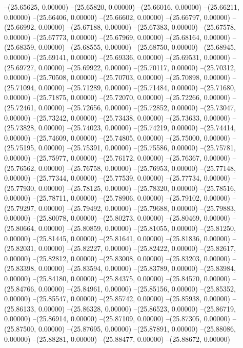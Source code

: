 --(25.65625, 0.00000)
--(25.65820, 0.00000)
--(25.66016, 0.00000)
--(25.66211, 0.00000)
--(25.66406, 0.00000)
--(25.66602, 0.00000)
--(25.66797, 0.00000)
--(25.66992, 0.00000)
--(25.67188, 0.00000)
--(25.67383, 0.00000)
--(25.67578, 0.00000)
--(25.67773, 0.00000)
--(25.67969, 0.00000)
--(25.68164, 0.00000)
--(25.68359, 0.00000)
--(25.68555, 0.00000)
--(25.68750, 0.00000)
--(25.68945, 0.00000)
--(25.69141, 0.00000)
--(25.69336, 0.00000)
--(25.69531, 0.00000)
--(25.69727, 0.00000)
--(25.69922, 0.00000)
--(25.70117, 0.00000)
--(25.70312, 0.00000)
--(25.70508, 0.00000)
--(25.70703, 0.00000)
--(25.70898, 0.00000)
--(25.71094, 0.00000)
--(25.71289, 0.00000)
--(25.71484, 0.00000)
--(25.71680, 0.00000)
--(25.71875, 0.00000)
--(25.72070, 0.00000)
--(25.72266, 0.00000)
--(25.72461, 0.00000)
--(25.72656, 0.00000)
--(25.72852, 0.00000)
--(25.73047, 0.00000)
--(25.73242, 0.00000)
--(25.73438, 0.00000)
--(25.73633, 0.00000)
--(25.73828, 0.00000)
--(25.74023, 0.00000)
--(25.74219, 0.00000)
--(25.74414, 0.00000)
--(25.74609, 0.00000)
--(25.74805, 0.00000)
--(25.75000, 0.00000)
--(25.75195, 0.00000)
--(25.75391, 0.00000)
--(25.75586, 0.00000)
--(25.75781, 0.00000)
--(25.75977, 0.00000)
--(25.76172, 0.00000)
--(25.76367, 0.00000)
--(25.76562, 0.00000)
--(25.76758, 0.00000)
--(25.76953, 0.00000)
--(25.77148, 0.00000)
--(25.77344, 0.00000)
--(25.77539, 0.00000)
--(25.77734, 0.00000)
--(25.77930, 0.00000)
--(25.78125, 0.00000)
--(25.78320, 0.00000)
--(25.78516, 0.00000)
--(25.78711, 0.00000)
--(25.78906, 0.00000)
--(25.79102, 0.00000)
--(25.79297, 0.00000)
--(25.79492, 0.00000)
--(25.79688, 0.00000)
--(25.79883, 0.00000)
--(25.80078, 0.00000)
--(25.80273, 0.00000)
--(25.80469, 0.00000)
--(25.80664, 0.00000)
--(25.80859, 0.00000)
--(25.81055, 0.00000)
--(25.81250, 0.00000)
--(25.81445, 0.00000)
--(25.81641, 0.00000)
--(25.81836, 0.00000)
--(25.82031, 0.00000)
--(25.82227, 0.00000)
--(25.82422, 0.00000)
--(25.82617, 0.00000)
--(25.82812, 0.00000)
--(25.83008, 0.00000)
--(25.83203, 0.00000)
--(25.83398, 0.00000)
--(25.83594, 0.00000)
--(25.83789, 0.00000)
--(25.83984, 0.00000)
--(25.84180, 0.00000)
--(25.84375, 0.00000)
--(25.84570, 0.00000)
--(25.84766, 0.00000)
--(25.84961, 0.00000)
--(25.85156, 0.00000)
--(25.85352, 0.00000)
--(25.85547, 0.00000)
--(25.85742, 0.00000)
--(25.85938, 0.00000)
--(25.86133, 0.00000)
--(25.86328, 0.00000)
--(25.86523, 0.00000)
--(25.86719, 0.00000)
--(25.86914, 0.00000)
--(25.87109, 0.00000)
--(25.87305, 0.00000)
--(25.87500, 0.00000)
--(25.87695, 0.00000)
--(25.87891, 0.00000)
--(25.88086, 0.00000)
--(25.88281, 0.00000)
--(25.88477, 0.00000)
--(25.88672, 0.00000)
